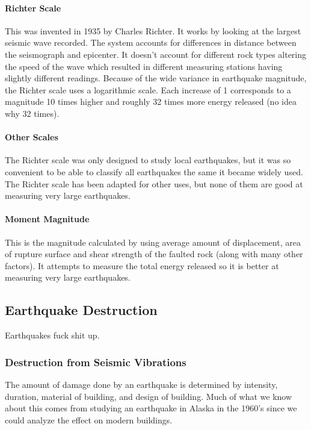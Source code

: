 \documentclass{article}
\begin{document}
\paragraph{Richter Scale} %
\label{par:richter_scale}
This was invented in 1935 by Charles Richter. It works by looking at the largest seismic wave recorded. The system accounts for differences in distance between the seismograph and epicenter. It doesn't account for different rock types altering the speed of the wave which resulted in different measuring stations having slightly different readings. Because of the wide variance in earthquake magnitude, the Richter scale uses a logarithmic scale. Each increase of 1 corresponds to a magnitude 10 times higher and roughly 32 times more energy released (no idea why 32 times).
\paragraph{Other Scales} %
\label{par:other_scales}
The Richter scale was only designed to study local earthquakes, but it was so convenient to be able to classify all earthquakes the same it became widely used. The Richter scale has been adapted for other uses, but none of them are good at measuring very large earthquakes.
\paragraph{Moment Magnitude} %
\label{par:moment_magnitude}
This is the magnitude calculated by using average amount of displacement, area of rupture surface and shear strength of the faulted rock (along with many other factors). It attempts to measure the total energy released so it is better at measuring very large earthquakes.

\subsection{Earthquake Destruction} %
\label{sub:earthquake_destruction}
Earthquakes fuck shit up.
\subsubsection{Destruction from Seismic Vibrations} %
\label{ssub:destruction_from_seismic_vibrations}
The amount of damage done by an earthquake is determined by intensity, duration, material of building, and design of building. Much of what we know about this comes from studying an earthquake in Alaska in the 1960's since we could analyze the effect on modern buildings.
\end{document}
